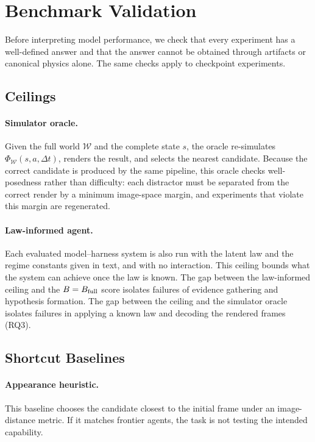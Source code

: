 \section{Benchmark Validation}
\label{sec:validation}

Before interpreting model performance, we check that every experiment has a well-defined answer and that the answer cannot be obtained through artifacts or canonical physics alone. The same checks apply to checkpoint experiments.

\subsection{Ceilings}

\paragraph{Simulator oracle.} Given the full world $\mathcal{W}$ and the complete state $s$, the oracle re-simulates $\Phi_{\mathcal{W}}(s,a,\Delta t)$, renders the result, and selects the nearest candidate. Because the correct candidate is produced by the same pipeline, this oracle checks well-posedness rather than difficulty: each distractor must be separated from the correct render by a minimum image-space margin, and experiments that violate this margin are regenerated. 

\paragraph{Law-informed agent.} Each evaluated model--harness system is also run with the latent law and the regime constants given in text, and with no interaction. This ceiling bounds what the system can achieve once the law is known. The gap between the law-informed ceiling and the $B=B_{\rm full}$ score isolates failures of evidence gathering and hypothesis formation. The gap between the ceiling and the simulator oracle isolates failures in applying a known law and decoding the rendered frames (RQ3). 

\subsection{Shortcut Baselines}

\paragraph{Appearance heuristic.} This baseline chooses the candidate closest to the initial frame under an image-distance metric. If it matches frontier agents, the task is not testing the intended capability.

